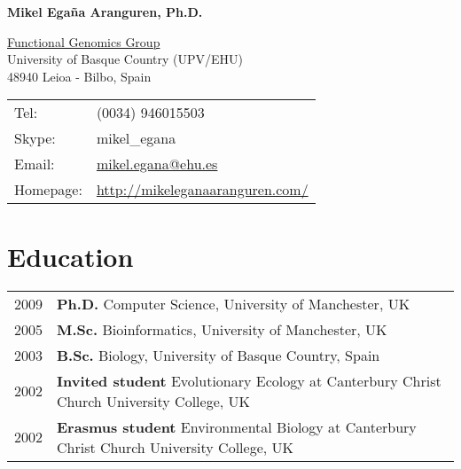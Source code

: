 \documentclass[11pt,fullpage]{article}
\newcommand{\etc}{\emph{etc.}}
\def\name{Mikel Ega\~na Aranguren, Ph.D.}
\begin{document}


\centerline{\Large \bf \name}

\vspace{0.25in}

\begin{minipage}{0.50\linewidth}
  \href{http://www.genomic-resources.eu/}{Functional Genomics Group} \\
  University of Basque Country (UPV/EHU) \\
  48940 Leioa - Bilbo, Spain \\

\end{minipage}
\begin{minipage}{0.50\linewidth}
  \begin{tabular}{ll}
    Tel: & (0034) 946015503 \\
    Skype: & mikel\_egana \\
    Email: & \href{mailto:mikel.egana@ehu.es}{mikel.egana@ehu.es} \\
    Homepage: & \href{http://mikeleganaaranguren.com/}{http://mikeleganaaranguren.com/} 
    
  \end{tabular}
\end{minipage}

\section*{Education}

\begin{tabular}{ll} 
	2009 & {\bf Ph.D.} Computer Science, University of Manchester, UK \\
	2005 & {\bf M.Sc.} Bioinformatics, University of Manchester, UK \\
	2003 & {\bf B.Sc.} Biology, University of Basque Country, Spain \\
	2002 & {\bf Invited student} Evolutionary Ecology at Canterbury Christ Church University College, UK \\
	2002 & {\bf Erasmus student} Environmental Biology at Canterbury Christ Church University College, UK \\
\end{tabular}
\end{document}
